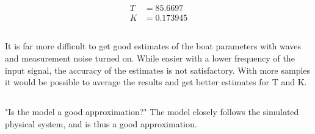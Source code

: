 \begin{align*}
    T &= 85.6697 \\
    K &= 0.173945
\end{align*}

\subsection{}
It is far more difficult to get good estimates of the boat parameters with waves and measurement noise turned on. While easier with a lower frequency of the input signal, the accuracy of the estimates is not satisfactory. With more samples it would be possible to average the results and get better estimates for T and K. 

\subsection{}
"Is the model a good approximation?"
The model closely follows the simulated physical system, and is thus a good approximation.